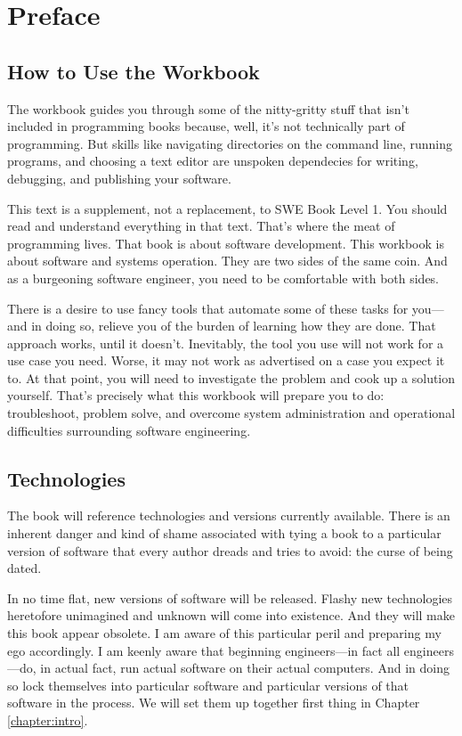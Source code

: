 \chapter{Preface}

\section*{How to Use the Workbook}
The workbook guides you through some of the nitty-gritty stuff that isn't included in programming books because, well, it's not technically part of programming. But skills like navigating directories on the command line, running programs, and choosing a text editor are unspoken dependecies for writing, debugging, and publishing your software.

This text is a supplement, not a replacement, to SWE Book Level 1. You should read and understand everything in that text. That's where the meat of programming lives. That book is about software development. This workbook is about software and systems operation. They are two sides of the same coin. And as a burgeoning software engineer, you need to be comfortable with both sides.

There is a desire to use fancy tools that automate some of these tasks for you---and in doing so, relieve you of the burden of learning how they are done. That approach works, until it doesn't. Inevitably, the tool you use will not work for a use case you need. Worse, it may not work as advertised on a case you expect it to. At that point, you will need to investigate the problem and cook up a solution yourself. That's precisely what this workbook will prepare you to do: troubleshoot, problem solve, and overcome system administration and operational difficulties surrounding software engineering.

\section*{Technologies}
The book will reference technologies and versions currently available. There is an inherent danger and kind of shame associated with tying a book to a particular version of software that every author dreads and tries to avoid: the curse of being dated.

In no time flat, new versions of software will be released. Flashy new technologies heretofore unimagined and unknown will come into existence. And they will make this book appear obsolete. I am aware of this particular peril and preparing my ego accordingly. I am keenly aware that beginning engineers---in fact all engineers---do, in actual fact, run actual software on their actual computers. And in doing so lock themselves into particular software and particular versions of that software in the process. We will set them up together first thing in Chapter \ref{chapter:intro}.
